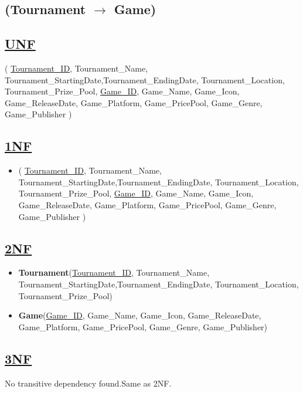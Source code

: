 \subsection{\texorpdfstring{\centering (Tournament $\rightarrow$ Game)}{ (Tournament-Game)}}

\subsection*{\underline{UNF}}

(
\underline{Tournament\_ID}, Tournament\_Name, Tournament\_StartingDate,Tournament\_EndingDate, Tournament\_Location, Tournament\_Prize\_Pool,
\underline{Game\_ID}, Game\_Name, Game\_Icon, Game\_ReleaseDate, Game\_Platform, Game\_PricePool, Game\_Genre, Game\_Publisher
)


\subsection*{\underline{1NF}}
\begin{itemize}
    \item (
          \underline{Tournament\_ID}, Tournament\_Name, Tournament\_StartingDate,Tournament\_EndingDate, Tournament\_Location, Tournament\_Prize\_Pool,
          \underline{Game\_ID}, Game\_Name, Game\_Icon, Game\_ReleaseDate, Game\_Platform, Game\_PricePool, Game\_Genre, Game\_Publisher
          )
\end{itemize}


\subsection*{\underline{2NF}}
\begin{itemize}
    \item \textbf{Tournament}(\underline{Tournament\_ID}, Tournament\_Name, Tournament\_StartingDate,Tournament\_EndingDate, Tournament\_Location, Tournament\_Prize\_Pool)
    \item \textbf{Game}(\underline{Game\_ID}, Game\_Name, Game\_Icon, Game\_ReleaseDate, Game\_Platform, Game\_PricePool, Game\_Genre, Game\_Publisher)
\end{itemize}

\subsection*{\underline{3NF}}
No transitive dependency found.Same as 2NF.

